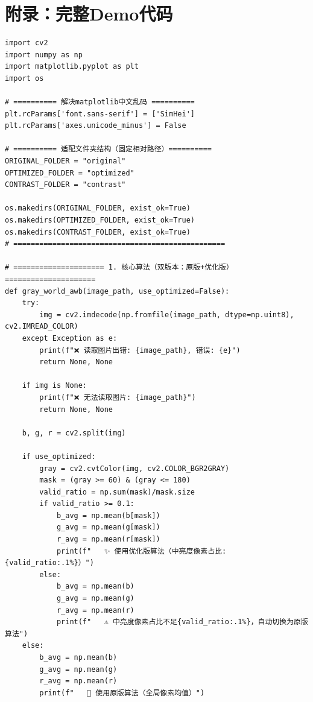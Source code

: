 \documentclass[12pt,a4paper,UTF8]{ctexart} %
\begin{document}
\newpage
\section*{附录：完整Demo代码}

\begin{lstlisting}[caption={完整的自动白平衡Demo代码（awb\_demo_v2.py）}, label=code:full]
import cv2
import numpy as np
import matplotlib.pyplot as plt
import os

# ========== 解决matplotlib中文乱码 ==========
plt.rcParams['font.sans-serif'] = ['SimHei']
plt.rcParams['axes.unicode_minus'] = False

# ========== 适配文件夹结构（固定相对路径）==========
ORIGINAL_FOLDER = "original"
OPTIMIZED_FOLDER = "optimized"
CONTRAST_FOLDER = "contrast"

os.makedirs(ORIGINAL_FOLDER, exist_ok=True)
os.makedirs(OPTIMIZED_FOLDER, exist_ok=True)
os.makedirs(CONTRAST_FOLDER, exist_ok=True)
# =================================================

# ===================== 1. 核心算法（双版本：原版+优化版）=====================
def gray_world_awb(image_path, use_optimized=False):
    try:
        img = cv2.imdecode(np.fromfile(image_path, dtype=np.uint8), cv2.IMREAD_COLOR)
    except Exception as e:
        print(f"❌ 读取图片出错: {image_path}, 错误: {e}")
        return None, None
    
    if img is None:
        print(f"❌ 无法读取图片: {image_path}")
        return None, None
    
    b, g, r = cv2.split(img)
    
    if use_optimized:
        gray = cv2.cvtColor(img, cv2.COLOR_BGR2GRAY)
        mask = (gray >= 60) & (gray <= 180)
        valid_ratio = np.sum(mask)/mask.size
        if valid_ratio >= 0.1:
            b_avg = np.mean(b[mask])
            g_avg = np.mean(g[mask])
            r_avg = np.mean(r[mask])
            print(f"   ✨ 使用优化版算法（中亮度像素占比: {valid_ratio:.1%}）")
        else:
            b_avg = np.mean(b)
            g_avg = np.mean(g)
            r_avg = np.mean(r)
            print(f"   ⚠️ 中亮度像素占比不足{valid_ratio:.1%}，自动切换为原版算法")
    else:
        b_avg = np.mean(b)
        g_avg = np.mean(g)
        r_avg = np.mean(r)
        print(f"   📌 使用原版算法（全局像素均值）")
    

\end{lstlisting}
\end{document}
